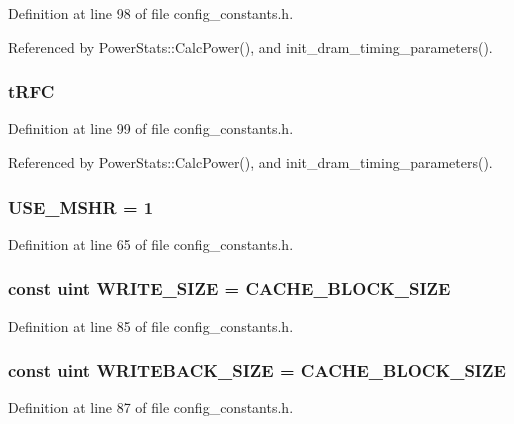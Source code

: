 Definition at line 98 of file config\_\-constants.h.

Referenced by PowerStats::CalcPower(), and init\_\-dram\_\-timing\_\-parameters().
\subsubsection[{tRFC}]{ {\bf tRFC}}\label{config__constants_8h_7a7954dd073cbc0e349508917b36bd6b}




Definition at line 99 of file config\_\-constants.h.

Referenced by PowerStats::CalcPower(), and init\_\-dram\_\-timing\_\-parameters().
\subsubsection[{USE\_\-MSHR}]{ {\bf USE\_\-MSHR} = 1}\label{config__constants_8h_5da9b77c2b6e7724a2509424704e2e0e}




Definition at line 65 of file config\_\-constants.h.
\subsubsection[{WRITE\_\-SIZE}]{\setlength{\rightskip}{0pt plus 5cm}const {\bf uint} {\bf WRITE\_\-SIZE} = {\bf CACHE\_\-BLOCK\_\-SIZE}}\label{config__constants_8h_c20076cb353e3c0eca6357054db302ef}




Definition at line 85 of file config\_\-constants.h.
\subsubsection[{WRITEBACK\_\-SIZE}]{\setlength{\rightskip}{0pt plus 5cm}const {\bf uint} {\bf WRITEBACK\_\-SIZE} = {\bf CACHE\_\-BLOCK\_\-SIZE}}\label{config__constants_8h_8104e7934ee02b29fba883f8378b3a0e}




Definition at line 87 of file config\_\-constants.h.